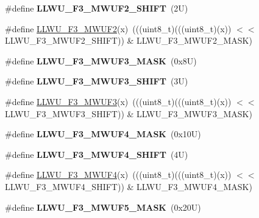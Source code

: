 \begin{DoxyCompactItemize}
\#define {\bfseries L\+L\+W\+U\+\_\+\+F3\+\_\+\+M\+W\+U\+F2\+\_\+\+S\+H\+I\+FT}~(2\+U)
\item 
\#define \mbox{\hyperlink{group___l_l_w_u___register___masks_gac71e0c2b5effba209a76bdea4199dcc9}{L\+L\+W\+U\+\_\+\+F3\+\_\+\+M\+W\+U\+F2}}(x)~(((uint8\+\_\+t)(((uint8\+\_\+t)(x)) $<$$<$ L\+L\+W\+U\+\_\+\+F3\+\_\+\+M\+W\+U\+F2\+\_\+\+S\+H\+I\+FT)) \& L\+L\+W\+U\+\_\+\+F3\+\_\+\+M\+W\+U\+F2\+\_\+\+M\+A\+SK)
\item 
\mbox{\label{group___l_l_w_u___register___masks_gab85f671f2c6f2112c4e2e14845ef998b}} 
\#define {\bfseries L\+L\+W\+U\+\_\+\+F3\+\_\+\+M\+W\+U\+F3\+\_\+\+M\+A\+SK}~(0x8\+U)
\item 
\mbox{\label{group___l_l_w_u___register___masks_ga91a71ba06b95076252cd2594112da05d}} 
\#define {\bfseries L\+L\+W\+U\+\_\+\+F3\+\_\+\+M\+W\+U\+F3\+\_\+\+S\+H\+I\+FT}~(3\+U)
\item 
\#define \mbox{\hyperlink{group___l_l_w_u___register___masks_gaf456eb8a736c3ef4d9813e6c8929fa05}{L\+L\+W\+U\+\_\+\+F3\+\_\+\+M\+W\+U\+F3}}(x)~(((uint8\+\_\+t)(((uint8\+\_\+t)(x)) $<$$<$ L\+L\+W\+U\+\_\+\+F3\+\_\+\+M\+W\+U\+F3\+\_\+\+S\+H\+I\+FT)) \& L\+L\+W\+U\+\_\+\+F3\+\_\+\+M\+W\+U\+F3\+\_\+\+M\+A\+SK)
\item 
\mbox{\label{group___l_l_w_u___register___masks_gabd85c849a3b177444a91aa37457252a8}} 
\#define {\bfseries L\+L\+W\+U\+\_\+\+F3\+\_\+\+M\+W\+U\+F4\+\_\+\+M\+A\+SK}~(0x10\+U)
\item 
\mbox{\label{group___l_l_w_u___register___masks_gac1d2eb89a620cf503f11eecf9e8ece1f}} 
\#define {\bfseries L\+L\+W\+U\+\_\+\+F3\+\_\+\+M\+W\+U\+F4\+\_\+\+S\+H\+I\+FT}~(4\+U)
\item 
\#define \mbox{\hyperlink{group___l_l_w_u___register___masks_gad93b6ad2aae5b9b2b211254f8734236e}{L\+L\+W\+U\+\_\+\+F3\+\_\+\+M\+W\+U\+F4}}(x)~(((uint8\+\_\+t)(((uint8\+\_\+t)(x)) $<$$<$ L\+L\+W\+U\+\_\+\+F3\+\_\+\+M\+W\+U\+F4\+\_\+\+S\+H\+I\+FT)) \& L\+L\+W\+U\+\_\+\+F3\+\_\+\+M\+W\+U\+F4\+\_\+\+M\+A\+SK)
\item 
\mbox{\label{group___l_l_w_u___register___masks_gaeb14754fa2d5b4c1fd50b9df98f11b01}} 
\#define {\bfseries L\+L\+W\+U\+\_\+\+F3\+\_\+\+M\+W\+U\+F5\+\_\+\+M\+A\+SK}~(0x20\+U)
$$
\end{DoxyCompactItemize}
